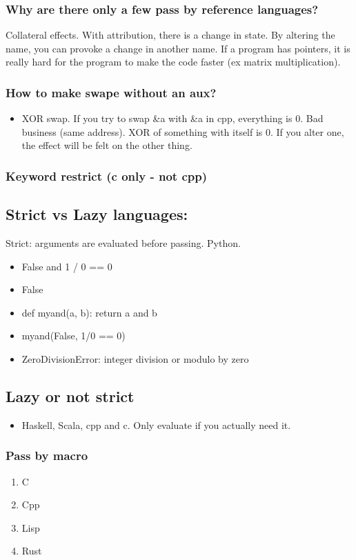 \documentclass[11pt]{article}
\begin{document}
\subsubsection{Why are there only a few pass by reference languages?}
\label{sec:org142ea34}
Collateral effects. With attribution, there is a change in state. By altering the
name, you can provoke a change in another name. If a program has pointers, it is
really hard for the program to make the code faster (ex matrix multiplication).
\subsubsection{How to make swape without an aux?}
\label{sec:orgf5e8383}
\begin{itemize}
\item XOR swap. If you try to swap \&a with \&a in cpp, everything is 0. Bad business (same
address). XOR of something with itself is 0. If you alter one, the effect will be
felt on the other thing.
\end{itemize}
\subsubsection{Keyword restrict (c only - not cpp)}
\label{sec:org01aff7e}
\subsection{Strict vs Lazy languages:}
\label{sec:org06a7296}
Strict: arguments are evaluated before passing. Python.
\begin{itemize}
\item False and 1 / 0 == 0
\item False

\item def myand(a, b): return a and b
\item myand(False, 1/0 == 0)
\item ZeroDivisionError: integer division or modulo by zero
\end{itemize}
\subsection{Lazy or not strict}
\label{sec:org2bdc2dd}
\begin{itemize}
\item Haskell, Scala, cpp and c. Only evaluate if you actually need it.
\end{itemize}
\subsubsection{Pass by macro}
\label{sec:orgf5e452d}
\begin{enumerate}
\item C

\item Cpp

\item Lisp

\item Rust
\end{enumerate}
\end{document}
